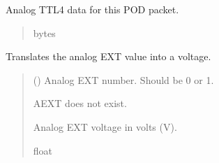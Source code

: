 \documentclass[letterpaper,10pt,english]{sphinxmanual}
\begin{document}
\begin{fulllineitems}
\begin{fulllineitems}
\begin{quote}
\begin{description}
\end{description}\end{quote}

\end{fulllineitems}


\begin{fulllineitems}
\label{\detokenize{PodApi.Packets:PodApi.Packets.Binary5.PacketBinary5.aTTL4}}
\pysigstartsignatures
{}
\pysigstopsignatures
\sphinxAtStartPar
Analog TTL4 data for this POD packet.
\begin{quote}\begin{description}
\sphinxAtStartPar
bytes

\end{description}\end{quote}

\end{fulllineitems}


\begin{fulllineitems}
\label{\detokenize{PodApi.Packets:PodApi.Packets.Binary5.PacketBinary5.AnalogEXT}}
\pysigstartsignatures
{}
\pysigstopsignatures
\sphinxAtStartPar
Translates the analog EXT value into a voltage.
\begin{quote}\begin{description}
\sphinxAtStartPar
{} () \textendash{} Analog EXT number. Should be 0 or 1.

\sphinxAtStartPar
{} \textendash{} AEXT does not exist.

\sphinxAtStartPar
Analog EXT voltage in volts (V).

\sphinxAtStartPar
float

\end{description}\end{quote}


\end{fulllineitems}
\end{fulllineitems}
\end{document}
